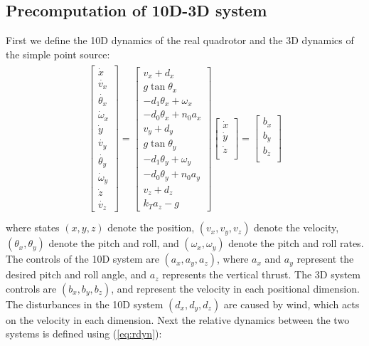 \subsection{Precomputation of 10D-3D system}
First we define the 10D dynamics of the real quadrotor and the 3D dynamics of the simple point source:
\begin{equation}
\label{eq:Quad10D_dyn}
\begin{aligned}
\begin{array}{c}
\left[
\begin{array}{c}
\dot{x}\\
\dot{v_x}\\
\dot{\theta_x}\\
\dot\omega_x\\
\dot{y}\\
\dot{v_y}\\
\dot{\theta_y}\\
\dot\omega_y\\
\dot{z}\\
\dot{v_z}
\end{array}
\right]
=
\left[
\begin{array}{c}
v_x + d_x\\
g \tan \theta_x\\
-d_1 \theta_x + \omega_x\\
-d_0 \theta_x + n_0 a_x\\
v_y + d_y\\
g \tan \theta_y\\
-d_1 \theta_y + \omega_y\\
-d_0 \theta_y + n_0 a_y\\
v_z + d_z\\
k_T a_z - g
\end{array}
\right]
\left[
\begin{array}{c}
\dot{x}\\
\dot{y}\\
\dot{z}\\
\end{array}
\right]
=
\left[
\begin{array}{c}
b_x\\
b_y\\
b_z \\
\end{array}
\right]
\end{array}\\
\end{aligned}
\end{equation}
where states $(x, y, z)$ denote the position, $(v_x, v_y, v_z)$ denote the velocity, $(\theta_x, \theta_y)$ denote the pitch and roll, and $(\omega_x, \omega_y)$ denote the pitch and roll rates. The controls of the 10D system are $(a_x, a_y, a_z)$, where $a_x$ and $a_y$ represent the desired pitch and roll angle, and $a_z$ represents the vertical thrust. The 3D system controls are $(b_x, b_y, b_z)$, and represent the velocity in each positional dimension. The disturbances in the 10D system $(d_x, d_y, d_z)$ are caused by wind, which acts on the velocity in each dimension. Next the relative dynamics between the two systems is defined using (\ref{eq:rdyn}):
